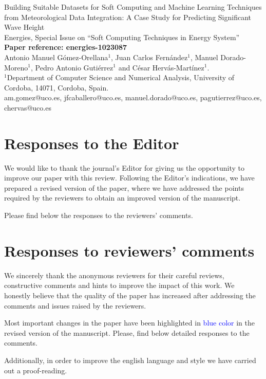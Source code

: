 \documentclass[a4paper,twoside,11pt]{article}
\makeatletter
\newcommand{\myAuthors}{Antonio Manuel Gómez-Orellana$^1$, Juan Carlos Fernández$^1$, Manuel Dorado-Moreno$^1$, Pedro Antonio Gutiérrez$^1$ and César Hervás-Martínez$^1$.}
\newcommand{\myEmail}{\Letter \quad  am.gomez@uco.es, jfcaballero@uco.es, manuel.dorado@uco.es, pagutierrez@uco.es, chervas@uco.es}
\newcommand{\myTitle}{Building Suitable Datasets for Soft Computing and Machine Learning Techniques from Meteorological Data Integration: A Case Study for Predicting Significant Wave Height}
\newcommand{\myJournal}{Energies, Special Issue on ``Soft Computing Techniques in Energy System''}
\newcommand{\myRefPaper}{\textbf{Paper reference: energies-1023087}}
\newcommand{\myDepartament}{$^1$Department of Computer Science and Numerical Analysis, University of Cordoba, 14071, Cordoba, Spain.}
\newcounter{comments}[section]
\makeatother
\begin{document}
\thispagestyle{plain}

\begin{center}
	{\LARGE\myTitle} \vspace{0.5cm} \\
	{\LARGE\myJournal} \vspace{0.5cm} \\
	{\Large\myRefPaper} \vspace{0.5cm} \\
	\myAuthors \vspace{0.5cm} \\
	{\myDepartament} \vspace{0.5cm} \\
	{\myEmail}
\end{center}


\section{Responses to the Editor}
We would like to thank the journal's Editor for giving us the opportunity to improve our paper with this review. Following the Editor's indications, we have prepared a revised version of the paper, where we have addressed the points required by the reviewers to obtain an improved version of the manuscript.

Please find below the responses to the reviewers' comments.



\section{Responses to reviewers' comments}
We sincerely thank the anonymous reviewers for their careful reviews, constructive comments and hints to improve the impact of this work. We honestly believe that the quality of the paper has increased after addressing the comments and issues raised by the reviewers. 

Most important changes in the paper have been highlighted in \textcolor{blue}{blue color} in the revised version of the manuscript. Please, find below detailed responses to the comments.

Additionally, in order to improve the english language and style we have carried out a proof-reading.

\end{document}
